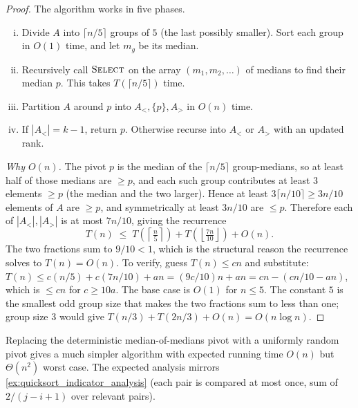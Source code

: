 \begin{proof}
\sketchproof The algorithm works in five phases.
\begin{enumerate}[(i)]
  \item Divide $A$ into $\lceil n/5 \rceil$ groups of $5$ (the last possibly smaller). Sort each group in $O(1)$ time, and let $m_g$ be its median.
  \item Recursively call $\textsc{Select}$ on the array $(m_1, m_2, \dots)$ of medians to find their median $p$. This takes $T(\lceil n/5 \rceil)$ time.
  \item Partition $A$ around $p$ into $A_<, \{p\}, A_>$ in $O(n)$ time.
  \item If $|A_<| = k - 1$, return $p$. Otherwise recurse into $A_<$ or $A_>$ with an updated rank.
\end{enumerate}
\noindent\textit{Why $O(n)$.} The pivot $p$ is the median of the $\lceil n/5 \rceil$ group-medians, so at least half of those medians are $\ge p$, and each such group contributes at least $3$ elements $\ge p$ (the median and the two larger). Hence at least $3 \lceil n/10 \rceil \ge 3n/10$ elements of $A$ are $\ge p$, and symmetrically at least $3n/10$ are $\le p$. Therefore each of $|A_<|, |A_>|$ is at most $7n/10$, giving the recurrence
\[
  T(n) \;\le\; T\!\left(\!\left\lceil \tfrac{n}{5} \right\rceil\!\right) + T\!\left(\!\left\lfloor \tfrac{7n}{10} \right\rfloor\!\right) + O(n).
\]
The two fractions sum to $9/10 < 1$, which is the structural reason the recurrence solves to $T(n) = O(n)$. To verify, guess $T(n) \le cn$ and substitute: $T(n) \le c(n/5) + c(7n/10) + an = (9c/10)n + an = cn - (cn/10 - an)$, which is $\le cn$ for $c \ge 10a$. The base case is $O(1)$ for $n \le 5$. The constant $5$ is the smallest odd group size that makes the two fractions sum to less than one; group size $3$ would give $T(n/3) + T(2n/3) + O(n) = O(n \log n)$.
\end{proof}

\begin{remark}
Replacing the deterministic median-of-medians pivot with a uniformly random pivot gives a much simpler algorithm with expected running time $O(n)$ but $\Theta(n^2)$ worst case. The expected analysis mirrors \cref{ex:quicksort_indicator_analysis} (each pair is compared at most once, sum of $2/(j-i+1)$ over relevant pairs).
\end{remark}

